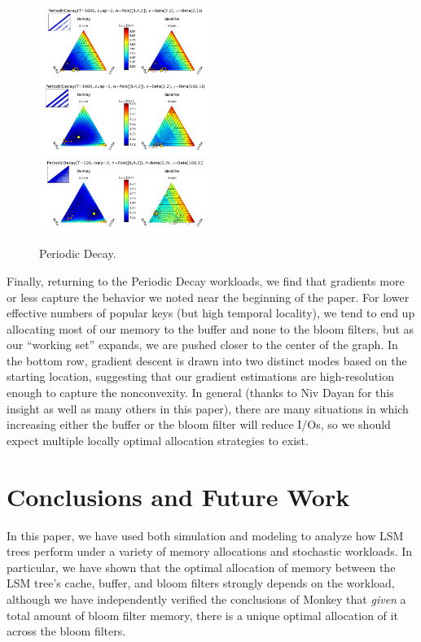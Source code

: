 \documentclass{sig-alternate-05-2015}
\begin{document}
\begin{figure}[!htb]
\begin{center}
\includegraphics[width=0.5\textwidth]{periodquiv3.png}
\includegraphics[width=0.5\textwidth]{periodquiv2.png}
\includegraphics[width=0.5\textwidth]{periodquiv1.png}
\end{center}
\caption{Periodic Decay.}
\label{fig:periodquiv}
\end{figure}

Finally, returning to the Periodic Decay workloads, we find that gradients more
or less capture the behavior we noted near the beginning of the paper. For
lower effective numbers of popular keys (but high temporal locality), we tend
to end up allocating most of our memory to the buffer and none to the bloom
filters, but as our ``working set'' expands, we are pushed closer to the center
of the graph. In the bottom row, gradient descent is drawn into two distinct
modes based on the starting location, suggesting that our gradient estimations
are high-resolution enough to capture the nonconvexity. In general (thanks to
Niv Dayan for this insight as well as many others in this paper), there are
many situations in which increasing either the buffer or the bloom filter will
reduce I/Os, so we should expect multiple locally optimal allocation strategies
to exist.

\section{Conclusions and Future Work}

In this paper, we have used both simulation and modeling to analyze how LSM
trees perform under a variety of memory allocations and stochastic workloads.
In particular, we have shown that the optimal allocation of memory between the
LSM tree's cache, buffer, and bloom filters strongly depends on the workload,
although we have independently verified the conclusions of Monkey \cite{monkey}
that \textit{given} a total amount of bloom filter memory, there is a unique
optimal allocation of it across the bloom filters.
\end{document}
